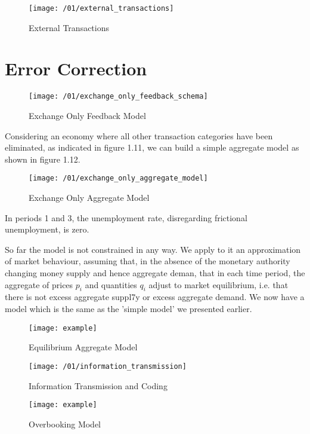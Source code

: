 \begin{figure}
\centering
\texttt{[image: /01/external\_transactions]}
\caption{External Transactions}
\label{fig:external_transactions}
\end{figure}

\section{Error Correction}

\begin{figure}
\centering
\texttt{[image: /01/exchange\_only\_feedback\_schema]}
\caption{Exchange Only Feedback Model}
\label{fig:exchange_only_feedback_schema}
\end{figure}

Considering an economy where all other transaction categories have been eliminated, as
indicated in figure 1.11, we can build a simple aggregate model as shown in figure 1.12.

\begin{figure}
\centering
\texttt{[image: /01/exchange\_only\_aggregate\_model]}
\caption{Exchange Only Aggregate Model}
\label{fig:exchange_only_aggregate_model}
\end{figure}

In periods 1 and 3, the unemployment rate, disregarding frictional unemployment, is zero.

So far the model is not constrained in any way. We apply to it an approximation of market behaviour,
assuming that, in the absence of the monetary authority changing money supply and hence aggregate
deman, that in each time period, the aggregate of prices \(p_i\) and quantities \(q_i\) adjust to
market equilibrium, i.e. that there is not excess aggregate suppl7y or excess aggregate demand. We
now have a model which is the same as the 'simple model' we presented earlier.

\begin{figure}
\centering
\texttt{[image: example]}
\caption{Equilibrium Aggregate Model}
\label{fig:equilibrium_aggregate_model}
\end{figure}

\begin{figure}
\centering
\texttt{[image: /01/information\_transmission]}
\caption{Information Transmission and Coding}
\label{fig:information_transmission}
\end{figure}

\begin{figure}
\centering
\texttt{[image: example]}
\caption{Overbooking Model}
\label{fig:overbooking}
\end{figure}

